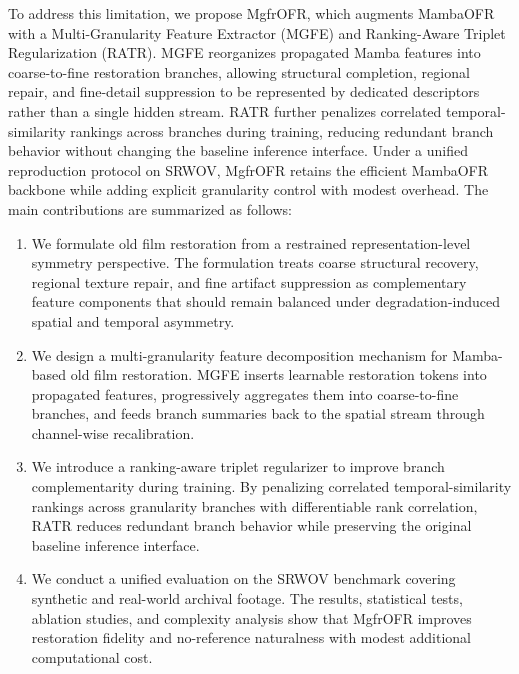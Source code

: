 To address this limitation, we propose MgfrOFR, which augments MambaOFR with a Multi-Granularity Feature Extractor (MGFE) and Ranking-Aware Triplet Regularization (RATR). MGFE reorganizes propagated Mamba features into coarse-to-fine restoration branches, allowing structural completion, regional repair, and fine-detail suppression to be represented by dedicated descriptors rather than a single hidden stream. RATR further penalizes correlated temporal-similarity rankings across branches during training, reducing redundant branch behavior without changing the baseline inference interface. Under a unified reproduction protocol on SRWOV, MgfrOFR retains the efficient MambaOFR backbone while adding explicit granularity control with modest overhead. The main contributions are summarized as follows:
\begin{enumerate}
    \item We formulate old film restoration from a restrained representation-level symmetry perspective. The formulation treats coarse structural recovery, regional texture repair, and fine artifact suppression as complementary feature components that should remain balanced under degradation-induced spatial and temporal asymmetry.
    \item We design a multi-granularity feature decomposition mechanism for Mamba-based old film restoration. MGFE inserts learnable restoration tokens into propagated features, progressively aggregates them into coarse-to-fine branches, and feeds branch summaries back to the spatial stream through channel-wise recalibration.
    \item We introduce a ranking-aware triplet regularizer to improve branch complementarity during training. By penalizing correlated temporal-similarity rankings across granularity branches with differentiable rank correlation, RATR reduces redundant branch behavior while preserving the original baseline inference interface.
    \item We conduct a unified evaluation on the SRWOV benchmark covering synthetic and real-world archival footage. The results, statistical tests, ablation studies, and complexity analysis show that MgfrOFR improves restoration fidelity and no-reference naturalness with modest additional computational cost.
\end{enumerate}
